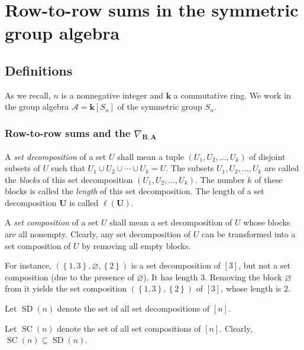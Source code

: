 \documentclass[numbers=enddot,12pt,final,onecolumn,notitlepage]{scrartcl}%
\numberwithin{exer}{subsection}
\theoremstyle{definition}
\begin{document}
\newpage

\section{\label{sec.row-to-row}Row-to-row sums in the symmetric group algebra}

\subsection{Definitions}

As we recall, $n$ is a nonnegative integer and $\mathbf{k}$ a commutative
ring. We work in the group algebra $\mathcal{A}=\mathbf{k}\left[
S_{n}\right]  $ of the symmetric group $S_{n}$.

\subsubsection{Row-to-row sums and the $\nabla_{\mathbf{B},\mathbf{A}}$}

A \emph{set decomposition} of a set $U$ shall mean a tuple $\left(
U_{1},U_{2},\ldots,U_{k}\right)  $ of disjoint subsets of $U$ such that
$U_{1}\cup U_{2}\cup\cdots\cup U_{k}=U$. The subsets $U_{1},U_{2},\ldots
,U_{k}$ are called the \emph{blocks} of this set decomposition $\left(
U_{1},U_{2},\ldots,U_{k}\right)  $. The number $k$ of these blocks is called
the \emph{length} of this set decomposition. The length of a set decomposition
$\mathbf{U}$ is called $\ell\left(  \mathbf{U}\right)  $.

A \emph{set composition} of a set $U$ shall mean a set decomposition of $U$
whose blocks are all nonempty. Clearly, any set decomposition of $U$ can be
transformed into a set composition of $U$ by removing all empty blocks.

For instance, $\left(  \left\{  1,3\right\}  ,\varnothing,\left\{  2\right\}
\right)  $ is a set decomposition of $\left[  3\right]  $, but not a set
composition (due to the presence of $\varnothing$). It has length $3$.
Removing the block $\varnothing$ from it yields the set composition $\left(
\left\{  1,3\right\}  ,\left\{  2\right\}  \right)  $ of $\left[  3\right]  $,
whose length is $2$.

Let $\operatorname*{SD}\left(  n\right)  $ denote the set of all set
decompositions of $\left[  n\right]  $.

Let $\operatorname*{SC}\left(  n\right)  $ denote the set of all set
compositions of $\left[  n\right]  $. Clearly, $\operatorname*{SC}\left(
n\right)  \subseteq\operatorname*{SD}\left(  n\right)  $.
\end{document}
